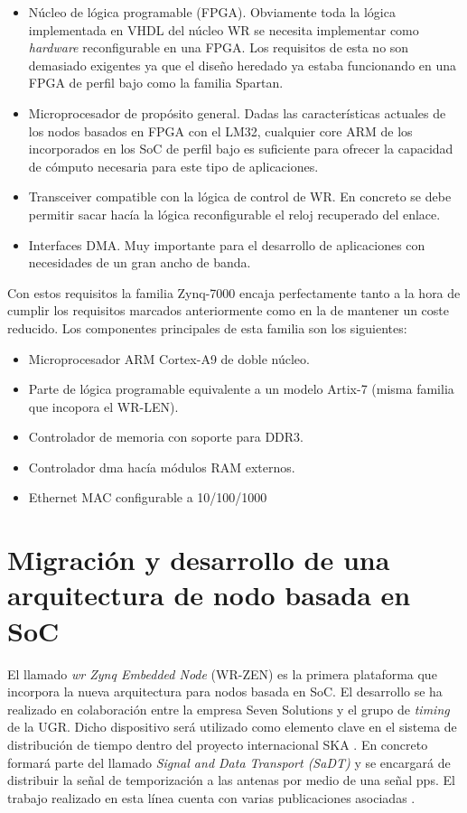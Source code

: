 \begin{itemize}
	\item Núcleo de lógica programable (FPGA). Obviamente toda la lógica 
	implementada en VHDL del núcleo WR se necesita implementar como 
	\textit{hardware} reconfigurable en una FPGA. Los requisitos de esta no son 
	demasiado exigentes ya que el diseño heredado ya estaba funcionando en una 
	FPGA de perfil bajo como la familia Spartan.
	
	\item Microprocesador de propósito general. Dadas las características 
	actuales de los nodos basados en FPGA con el LM32, cualquier core ARM de 
	los incorporados en los SoC de perfil bajo es suficiente para ofrecer la 
	capacidad de cómputo necesaria para este tipo de aplicaciones.
	
	\item Transceiver compatible con la lógica de control de WR. En concreto se 
	debe permitir sacar hacía la lógica reconfigurable el reloj recuperado del 
	enlace.
	
	\item Interfaces DMA. Muy importante para el desarrollo de aplicaciones con 
	necesidades de un gran ancho de banda.
\end{itemize}

Con estos requisitos la familia Zynq-7000 encaja perfectamente tanto a la hora 
de cumplir los requisitos marcados anteriormente como en la de mantener un 
coste reducido. Los componentes principales de esta familia son los siguientes:

\begin{itemize}
	\item Microprocesador ARM Cortex-A9 de doble núcleo.
	\item Parte de lógica programable equivalente a un modelo Artix-7 (misma 
	familia que incopora el WR-LEN).
	\item Controlador de memoria con soporte para DDR3.
	\item Controlador \gls{dma} hacía módulos RAM externos.
	\item Ethernet MAC configurable a 10/100/1000 
\end{itemize}

\section{Migración y desarrollo de una arquitectura de nodo basada en SoC}

El llamado \textit{\acrlong{wr} Zynq Embedded Node} (WR-ZEN) es la primera 
plataforma que incorpora la nueva arquitectura para nodos basada en SoC. El 
desarrollo se ha realizado en colaboración entre la empresa Seven Solutions y 
el grupo de \textit{timing} de la UGR. Dicho dispositivo será utilizado como 
elemento clave en el sistema de distribución de tiempo dentro del proyecto 
internacional SKA \cite{website:ska}. En concreto formará parte del llamado 
\textit{Signal and Data Transport (SaDT)} y se encargará de distribuir la señal 
de temporización a las antenas por medio de una señal \gls{pps}. El trabajo 
realizado en esta línea cuenta con varias publicaciones asociadas 
\cite{klyone16} \cite{klyone17}.

